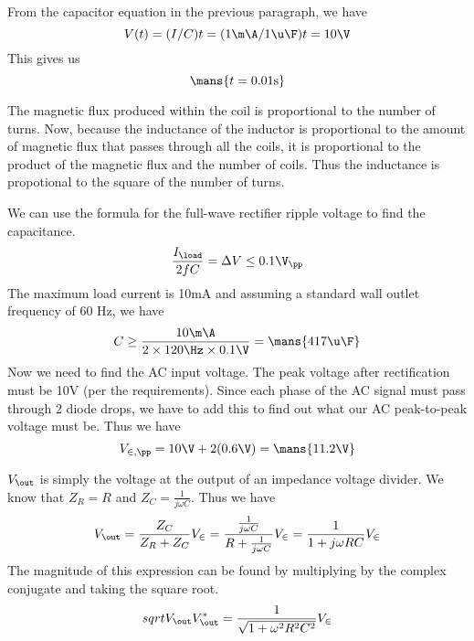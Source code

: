 \documentclass{article}
\begin{document}

    From the capacitor equation in the previous paragraph, we have 
    \[V(t) = (I/C)t = (1 \m\A/1\u\F)t = 10\V\]
    This gives us
    \[\mans{t = 0.01\text{s}}\]

    The magnetic flux produced within the coil is proportional to the number of turns. Now, because the inductance of the inductor is proportional to the amount of magnetic flux that passes through all the coils, it is proportional to the product of the magnetic flux and the number of coils. Thus the inductance is propotional to the square of the number of turns.

    We can use the formula for the full-wave rectifier ripple voltage to find the capacitance.
    \[\frac{I_\load}{2fC} = \Delta V \le 0.1 \V_\pp\]
    The maximum load current is 10mA and assuming a standard wall outlet frequency of 60 Hz, we have
    \[C \ge \frac{10\m\A}{2\times 120\Hz \times 0.1\V} = \mans{417 \u\F}\]
    Now we need to find the AC input voltage. The peak voltage after rectification must be 10V (per the requirements). Since each phase of the AC signal must pass through 2 diode drops, we have to add this to find out what our AC peak-to-peak voltage must be. Thus we have
    \[V_{\in, \pp} = 10\V + 2(0.6\V) = \mans{11.2\V}\]

    $V_\out$ is simply the voltage at the output of an impedance voltage divider. We know that $Z_R = R$ and $Z_C = \frac{1}{j\omega C}$. Thus we have 
    \[V_\out = \frac{Z_C}{Z_R + Z_C} V_\in = \frac{\frac{1}{j \omega C}}{R + \frac{1}{j \omega C}} V_\in = \frac{1}{1 + j \omega R C} V_\in\]
    The magnitude of this expression can be found by multiplying by the complex conjugate and taking the square root.
    \[sqrt{V_\out V_\out^*} = \frac{1}{\sqrt{1 + \omega^2R^2C^2}}V_\in\]
    
\end{document}
